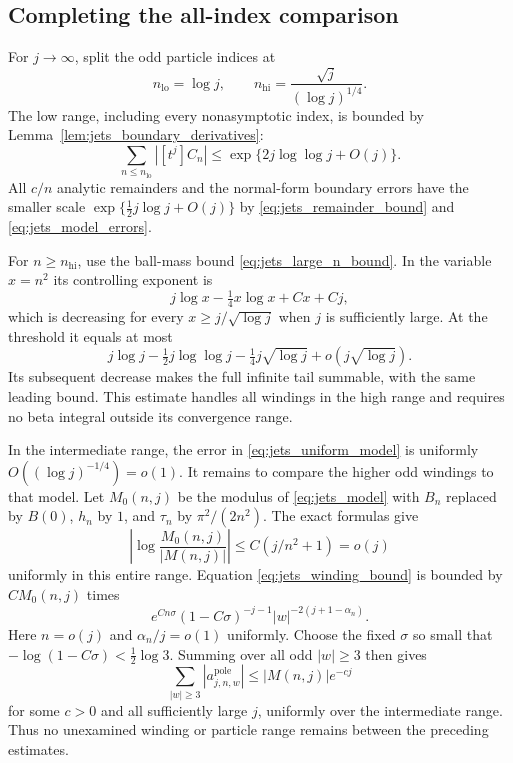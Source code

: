 \documentclass[11pt]{article}
\numberwithin{equation}{section}
\theoremstyle{definition}
\begin{document}
\subsection{Completing the all-index comparison}

For $j\to\infty$, split the odd particle indices at
\[
 n_{\mathrm{lo}}=\log j,\qquad
 n_{\mathrm{hi}}=\frac{\sqrt j}{(\log j)^{1/4}}.
\]
The low range, including every nonasymptotic index, is bounded by
Lemma~\ref{lem:jets_boundary_derivatives}:
\begin{equation}\label{eq:jets_low_range}
 \sum_{n\le n_{\mathrm{lo}}}|[t^j]C_n|
 \le\exp\{2j\log\log j+O(j)\}.
\end{equation}
All $c/n$ analytic remainders and the normal-form boundary errors
have the smaller scale
$\exp\{\tfrac12j\log j+O(j)\}$ by
\eqref{eq:jets_remainder_bound} and
\eqref{eq:jets_model_errors}.

For $n\ge n_{\mathrm{hi}}$, use the ball-mass bound
\eqref{eq:jets_large_n_bound}. In the variable $x=n^2$ its
controlling exponent is
\[
 j\log x-\tfrac14x\log x+Cx+Cj,
\]
which is decreasing for every $x\ge j/\sqrt{\log j}$ when $j$
is sufficiently large. At the threshold it equals at most
\begin{equation}\label{eq:jets_high_range}
 j\log j-\tfrac12j\log\log j-\tfrac14j\sqrt{\log j}
       +o(j\sqrt{\log j}).
\end{equation}
Its subsequent decrease makes the full infinite tail summable,
with the same leading bound. This estimate handles all windings in
the high range and requires no beta integral outside its
convergence range.

In the intermediate range, the error in
\eqref{eq:jets_uniform_model} is uniformly
$O((\log j)^{-1/4})=o(1)$. It remains to compare the higher odd
windings to that model. Let $M_0(n,j)$ be the modulus of
\eqref{eq:jets_model} with $B_n$ replaced by $B(0)$, $h_n$ by
$1$, and $\tau_n$ by $\pi^2/(2n^2)$. The exact formulas give
\begin{equation}\label{eq:jets_baseline_ratio}
 \left|\log\frac{M_0(n,j)}{|M(n,j)|}\right|
 \le C(j/n^2+1)=o(j)
\end{equation}
uniformly in this entire range. Equation
\eqref{eq:jets_winding_bound} is bounded by $CM_0(n,j)$ times
\[
 e^{Cn\sigma}(1-C\sigma)^{-j-1}
 |w|^{-2(j+1-\alpha_n)}.
\]
Here $n=o(j)$ and $\alpha_n/j=o(1)$ uniformly. Choose the fixed
$\sigma$ so small that $-\log(1-C\sigma)<\tfrac12\log3$.
Summing over all odd $|w|\ge3$ then gives
\begin{equation}\label{eq:jets_higher_windings_negligible}
 \sum_{|w|\ge3}|a_{j,n,w}^{\mathrm{pole}}|
 \le |M(n,j)|e^{-c j}
\end{equation}
for some $c>0$ and all sufficiently large $j$, uniformly over the
intermediate range. Thus no unexamined winding or particle range
remains between the preceding estimates.
\end{document}
